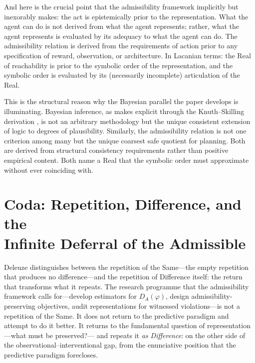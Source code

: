 \documentclass[10pt,a4paper]{article}
\begin{document}
And here is the crucial point that the admissibility framework implicitly
but inexorably makes: the act is epistemically prior to the representation.
What the agent can do is not derived from what the agent represents; rather,
what the agent represents is evaluated by its adequacy to what the agent can
do. The admissibility relation is derived from the requirements of action
prior to any specification of reward, observation, or architecture. In
Lacanian terms: the Real of reachability is prior to the symbolic order of
the representation, and the symbolic order is evaluated by its (necessarily
incomplete) articulation of the Real.

This is the structural reason why the Bayesian parallel the paper develops
is illuminating. Bayesian inference, as \citet{jaynes2003probability} makes
explicit through the Knuth--Skilling derivation \citep{knuth2012foundations},
is not an arbitrary methodology but the unique consistent extension of logic
to degrees of plausibility. Similarly, the admissibility relation is not one
criterion among many but the unique coarsest safe quotient for planning. Both
are derived from structural consistency requirements rather than positive
empirical content. Both name a Real that the symbolic order must approximate
without ever coinciding with.

\section{Coda: Repetition, Difference, and the\\
Infinite Deferral of the Admissible}

Deleuze \citeyearpar{deleuze1994difference} distinguishes between the repetition
of the Same---the empty repetition that produces no difference---and the
repetition of Difference itself: the return that transforms what it repeats.
The research programme that the admissibility framework calls for---develop
estimators for $D_A(\varphi)$, design admissibility-preserving objectives,
audit representations for witnessed violations---is not a repetition of the Same.
It does not return to the predictive paradigm and attempt to do it better.
It returns to the fundamental question of representation---what must be preserved?---
and repeats it \emph{as Difference}: on the other side of the
observational--interventional gap, from the enunciative position that the
predictive paradigm forecloses.
\end{document}
